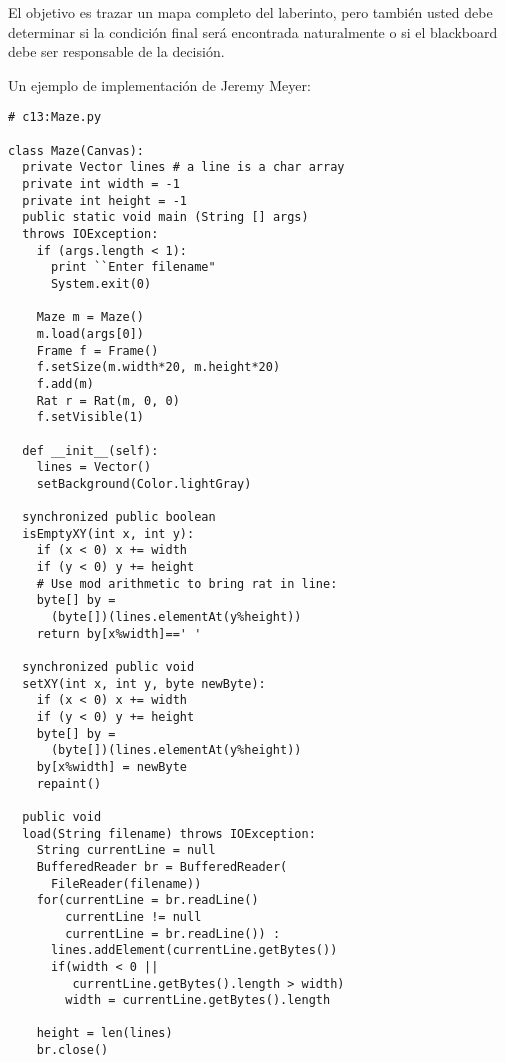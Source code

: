 El objetivo es trazar un mapa completo del laberinto, pero también usted debe determinar si la condición final será encontrada naturalmente o si el blackboard debe ser responsable de la decisión. \newline

Un ejemplo de implementación de Jeremy Meyer:    \newline

\begin{lstlisting}
# c13:Maze.py 

class Maze(Canvas): 
  private Vector lines # a line is a char array 
  private int width = -1 
  private int height = -1 
  public static void main (String [] args)  
  throws IOException: 
    if (args.length < 1): 
      print ``Enter filename" 
      System.exit(0) 
      
    Maze m = Maze() 
    m.load(args[0]) 
    Frame f = Frame() 
    f.setSize(m.width*20, m.height*20) 
    f.add(m)      
    Rat r = Rat(m, 0, 0) 
    f.setVisible(1) 
    
  def __init__(self): 
    lines = Vector() 
    setBackground(Color.lightGray) 
    
  synchronized public boolean  
  isEmptyXY(int x, int y): 
    if (x < 0) x += width 
    if (y < 0) y += height  
    # Use mod arithmetic to bring rat in line: 
    byte[] by =  
      (byte[])(lines.elementAt(y%height))   
    return by[x%width]==' ' 
    
  synchronized public void  
  setXY(int x, int y, byte newByte): 
    if (x < 0) x += width 
    if (y < 0) y += height  
    byte[] by =  
      (byte[])(lines.elementAt(y%height)) 
    by[x%width] = newByte 
    repaint() 
    
  public void  
  load(String filename) throws IOException: 
    String currentLine = null 
    BufferedReader br = BufferedReader( 
      FileReader(filename)) 
    for(currentLine = br.readLine()  
        currentLine != null 
        currentLine = br.readLine()) : 
      lines.addElement(currentLine.getBytes())        
      if(width < 0 ||  
         currentLine.getBytes().length > width) 
        width = currentLine.getBytes().length 
        
    height = len(lines) 
    br.close() 
    

\end{lstlisting}
